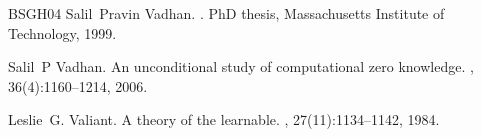 \documentclass[10pt,a4paper]{article}
\begin{document}
\begin{thebibliography}{BSGH{\etalchar{+}}04}
Salil~Pravin Vadhan.
.
\newblock PhD thesis, Massachusetts Institute of Technology, 1999.

Salil~P Vadhan.
\newblock An unconditional study of computational zero knowledge.
, 36(4):1160--1214, 2006.

Leslie~G. Valiant.
\newblock A theory of the learnable.
, 27(11):1134--1142, 1984.

\end{thebibliography}
\end{document}

